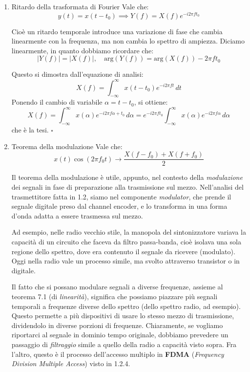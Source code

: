 \documentclass[a4paper,11pt]{article}
\begin{document}
\begin{enumerate}
\begin{enumerate}
\end{enumerate}

\item \begin{theorem}{Ritardo della trasformata di Fourier}
Vale che:
$$
y(t) = x(t - t_0) \implies Y(f) = X(f) e^{-i 2 \pi f t_0}
$$
\end{theorem}

Cioè un ritardo temporale introduce una variazione di fase che cambia linearmente con la frequenza, ma non cambia lo spettro di ampiezza. Diciamo linearmente, in quanto dobbiamo ricordare che:
$$
|Y(f)| = |X(f)|, \quad \mathrm{arg} \left( Y(f) \right) = \mathrm{arg} \left( X(f) \right) - 2 \pi f t_0
$$

Questo si dimostra dall'equazione di analisi:
$$
X(f) = \int_{-\infty}^{\infty} x(t - t_0) e^{-i 2 \pi f t} \, dt
$$
Ponendo il cambio di variabile $\alpha = t - t_0$, si ottiene:
$$
X(f) = \int_{-\infty}^{\infty} x(\alpha) e^{-i 2 \pi f \alpha + t_0} \, d \alpha = e^{-i 2 \pi f t_0} \int_{-\infty}^{\infty} x(\alpha) e^{-i 2 \pi f \alpha} \, d \alpha
$$
che è la tesi. \hfill $\square$

\item \begin{theorem}{Teorema della modulazione}
Vale che:
$$
x(t) \cos(2 \pi f_0 t) \rightarrow \frac{X(f - f_0) + X(f + f_0)}{2}
$$
\end{theorem}

Il teorema della modulazione è utile, appunto, nel contesto della \textit{modulazione} dei segnali in fase di preparazione alla trasmissione sul mezzo. Nell'analisi del trasmettitore fatta in 1.2, siamo nel componente \textit{modulator}, che prende il segnale digitale preso dal channel encoder, e lo transforma in una forma d’onda adatta a essere trasmessa sul mezzo.

Ad esempio, nelle radio vecchio stile, la manopola del sintonizzatore variava la capacità di un circuito che faceva da filtro passa-banda, cioè isolava una sola regione dello spettro, dove era contenuto il segnale da ricevere (modulato). Oggi nella radio vale un processo simile, ma svolto attraverso transistor o in digitale.

Il fatto che si possano modulare segnali a diverse frequenze, assieme al teorema 7.1 (di \textit{linearità}), significa che possiamo piazzare più segnali temporali a frequenze diverse dello spettro (dello spettro radio, ad esempio). Questo permette a più dispositivi di usare lo stesso mezzo di trasmissione, dividendolo in diverse porzioni di frequenze. Chiaramente, se vogliamo riportarci al segnale in dominio tempo originale, dobbiamo prevedere un passaggio di \textit{filtraggio} simile a quello della radio a capacità visto sopra. Fra l'altro, questo è il processo dell'accesso multiplo in \textbf{FDMA} (\textit{Frequency Division Multiple Access}) visto in 1.2.4.


\end{enumerate}
\end{document}
